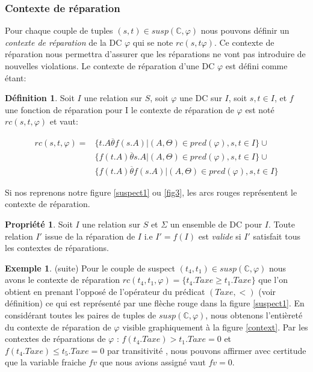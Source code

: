 \documentclass[letterpaper, 12pt]{report}
\theoremstyle{definition}
\newtheorem{mydef}{Définition}
\newtheorem{myprop}{Propriété}
\newtheorem{myexample}{Exemple}
\begin{document}
\subsubsection{Contexte de réparation}

Pour chaque couple de tuples $(s,t)\in susp(\mathbb{C},\varphi)$ nous pouvons définir un \emph{contexte de réparation} de la DC $\varphi$ qui se note $rc(s,t\varphi)$. Ce contexte de réparation nous permettra d'assurer que les réparations ne vont pas introduire de nouvelles violations. Le contexte de réparation d'une DC $\varphi$ est défini comme étant:

\begin{mydef}
Soit $I$ une relation sur $S$, soit $\varphi$ une DC sur $I$, soit $s,t \in I$, et $f$ une fonction de réparation pour I le contexte de réparation de $\varphi$ est noté $rc(s,t,\varphi)$ et vaut:

\begin{displaymath}
	\begin{split}
		rc(s,t,\varphi) = 
		&\{ t.A \overline{\theta} f(s.A) | (A,\Theta) \in pred(\varphi) , s,t \in I \}\cup\\
		&\{ f(t.A) \overline{\theta} s.A | (A,\Theta) \in pred(\varphi) , s,t \in I  \}\cup\\
		&\{ f(t.A) \overline{\theta} f(s.A) | (A,\Theta) \in pred(\varphi) , s,t \in I  \}
	\end{split}
\end{displaymath}

\end{mydef}
Si nos reprenons notre figure \ref{suspect1}  ou \ref{fig3}, les arcs rouges représentent le contexte de réparation.
 
\begin{myprop}
 Soit $I$ une relation sur $S$ et $\Sigma$ un ensemble de DC pour $I$. Toute relation $I'$ issue de la réparation de $I$ i.e $I' = f(I)$ est \emph{valide} si $I'$ satisfait tous les contextes de réparations.
\end{myprop}

\begin{myexample} (suite)
Pour le couple de suspect $(t_4,t_1) \in susp(\mathbb{C},\varphi)$ nous avons le contexte de réparation $rc(t_4,t_1,\varphi) = \{ t_4.Taxe \geq t_1.Taxe \}$ que l'on obtient en prenant l'opposé de l'opérateur du prédicat $(Taxe, <)$ (voir définition) ce qui est représenté par une flèche rouge dans la figure \ref{suspect1}. En considérant toutes les paires de tuples de $susp(\mathbb{C},\varphi)$, nous obtenons l'entièreté du contexte de réparation de $\varphi$ visible graphiquement à la figure \ref{context}. Par les contextes de réparations de $\varphi$ : $f(t_4.Taxe) > t_1.Taxe = 0$ et $f(t_4.Taxe) \leq t_5.Taxe = 0$ par transitivité , nous pouvons affirmer avec certitude que la variable fraiche $fv$ que nous avions assigné vaut $fv = 0$.
\end{myexample}
\end{document}
